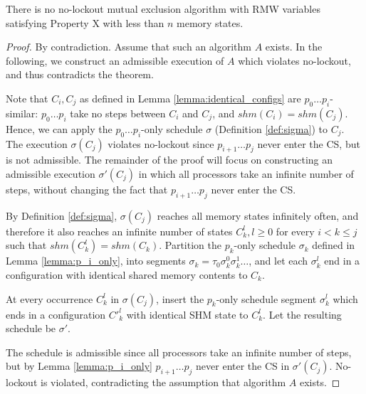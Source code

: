 \begin{theorem}
There is no no-lockout mutual exclusion algorithm with RMW variables satisfying
Property X with less than $n$ memory states.
\end{theorem}

\begin{proof}
By contradiction. Assume that such an algorithm $A$ exists.
In the following, we construct an admissible execution of $A$ which violates
no-lockout, and thus contradicts the theorem.

Note that $C_i, C_j$ as defined in Lemma \ref{lemma:identical_configs}
are $p_0 \ldots p_i$-similar: $p_0 \ldots p_i$ take no steps between
$C_i$ and $C_j$, and $shm(C_i) = shm(C_j)$. Hence, we can apply the 
$p_0 \ldots p_i$-only schedule $\sigma$ (Definition \ref{def:sigma})
to $C_j$. The execution $\sigma(C_j)$ violates no-lockout since $p_{i+1} \ldots p_j$
never enter the CS, but is not admissible. The remainder of the proof will
focus on constructing an admissible execution $\sigma'(C_j)$ in which
all processors take an infinite number of steps, without changing the fact that
$p_{i+1} \ldots p_j$ never enter the CS.

By Definition \ref{def:sigma}, $\sigma(C_j)$ reaches all memory states infinitely
often, and therefore it also reaches an infinite number of states
$C^l_k, l \geq 0$ for every $i < k \leq j$ such that $shm(C^l_k) = shm(C_k)$. 
Partition the $p_k$-only schedule $\sigma_k$ defined in Lemma \ref{lemma:p_i_only},
into segments $\sigma_k = \tau_0 \sigma_k^0 \sigma_k^1 \ldots$, and let each 
$\sigma_k^l$ end in a configuration with identical shared memory contents to $C_k$.

At every occurrence
$C^l_k$ in $\sigma(C_j)$, insert the $p_k$-only schedule segment $\sigma^l_k$ which ends in
a configuration $C'^l_k$ with identical SHM state to $C^l_k$.
Let the resulting schedule be $\sigma'$.

The schedule is admissible since all processors take
an infinite number of steps, but by Lemma \ref{lemma:p_i_only} $p_{i+1} \ldots p_j$
never enter the CS in $\sigma'(C_j)$. No-lockout is violated,
contradicting the assumption that algorithm $A$ exists.
\end{proof}
